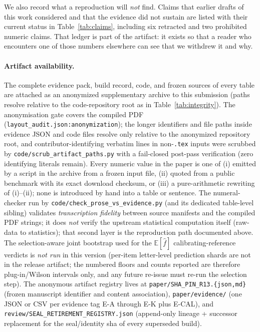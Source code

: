 We also record what a reproduction will \emph{not} find. Claims that earlier drafts of this
work considered and that the evidence did not sustain are listed with their current status
in Table~\ref{tab:claims}, including six retracted and two prohibited numeric claims. That
ledger is part of the artifact: it exists so that a reader who encounters one of those
numbers elsewhere can see that we withdrew it and why.

\paragraph{Artifact availability.}
The complete evidence pack, build record, code, and frozen
sources of every table are attached as an anonymized supplementary archive to this
submission (paths resolve relative to the code-repository root as in Table~\ref{tab:integrity}). The
anonymisation gate covers the compiled PDF (\texttt{layout\_audit.json:anonymization});
the longer identifiers and file paths inside evidence JSON and code files resolve only
relative to the anonymized repository root, and contributor-identifying
verbatim lines in non-\texttt{.tex} inputs were scrubbed by \texttt{code/scrub\_artifact\_paths.py}
with a fail-closed post-pass verification (zero identifying literals remain). Every
numeric value in the paper is one of (i) emitted by a script in the archive from a frozen
input file, (ii) quoted from a public benchmark with its exact download checksum, or (iii)
a pure-arithmetic rewriting of (i)--(ii); none is introduced by hand into a table or
sentence. The numeral-checker run by \texttt{code/check\_prose\_vs\_evidence.py}
(and its dedicated table-level sibling) validates \emph{transcription fidelity} between
source manifests and the compiled PDF strings; it does \emph{not} verify the upstream
statistical computation itself (raw-data to statistics); that second layer is the
reproduction path documented above. The selection-aware joint bootstrap used for the
$\mathbb{E}[\hat f]$ calibrating-reference verdicts is \emph{not run} in this version
(per-item letter-level prediction shards are not in the release artifact; the
numbered floors and counts reported are therefore plug-in/Wilson intervals only, and any
future re-issue must re-run the selection step). The anonymous artifact registry lives
at \texttt{paper/SHA\_PIN\_R13.\{json,md\}} (frozen manuscript identifier and content
association), \texttt{paper/evidence/} (one JSON or CSV per evidence tag \textsf{E-A}
through \textsf{E-K} plus \textsf{E-CAL}), and \texttt{review/SEAL\_RETIREMENT\_REGISTRY.json}
(append-only lineage + successor replacement for the seal/identity sha of every
superseded build).
